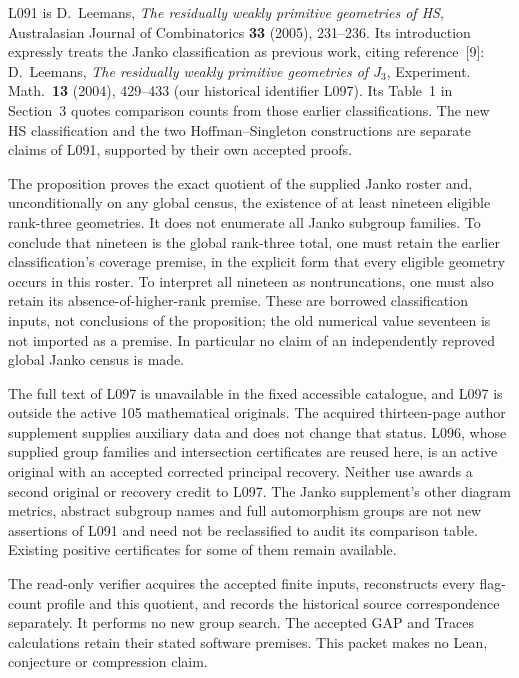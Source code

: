 \documentclass[11pt]{article}
\begin{document}
L091 is D.~Leemans, \emph{The residually weakly primitive geometries of HS},
Australasian Journal of Combinatorics \textbf{33} (2005), 231--236.
Its introduction expressly treats the Janko classification as previous
work, citing reference~[9]: D.~Leemans, \emph{The residually weakly primitive
geometries of $J_3$}, Experiment. Math.\ \textbf{13} (2004), 429--433
(our historical identifier L097). Its Table~1 in Section~3 quotes
comparison counts from those earlier classifications. The new HS
classification and the two Hoffman--Singleton constructions are separate
claims of L091, supported by their own accepted proofs.

The proposition proves the exact quotient of the supplied Janko roster
and, unconditionally on any global census, the existence of at least
nineteen eligible rank-three geometries. It does not enumerate all Janko
subgroup families. To conclude that nineteen is the global rank-three
total, one must retain the earlier classification's coverage premise,
in the explicit form that every eligible geometry occurs in this roster.
To interpret all nineteen as nontruncations, one must also retain its
absence-of-higher-rank premise. These are borrowed classification inputs,
not conclusions of the proposition; the old numerical value seventeen
is not imported as a premise. In particular no claim of an independently
reproved global Janko census is made.

The full text of L097 is unavailable in the fixed accessible catalogue,
and L097 is outside the active 105 mathematical originals. The acquired
thirteen-page author supplement supplies auxiliary data and does not
change that status. L096, whose supplied group families and intersection
certificates are reused here, is an active original with an accepted
corrected principal recovery. Neither use awards a second original or
recovery credit to L097. The Janko supplement's other diagram metrics,
abstract subgroup names and full automorphism groups are not new
assertions of L091 and need not be reclassified to audit its comparison
table. Existing positive certificates for some of them remain available.

The read-only verifier acquires the accepted finite inputs, reconstructs
every flag-count profile and this quotient, and records the historical
source correspondence separately. It performs no new group search.
The accepted GAP and Traces calculations retain their stated software
premises. This packet makes no Lean, conjecture or compression claim.
\end{document}
